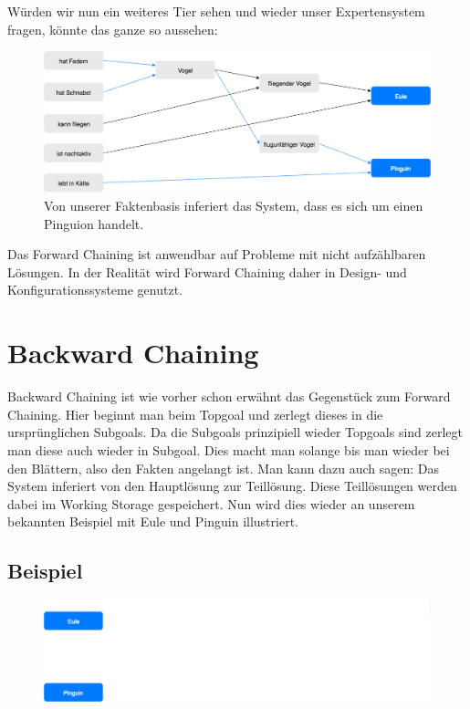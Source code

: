 \noindent Würden wir nun ein weiteres Tier sehen und wieder unser Expertensystem fragen, könnte das ganze so aussehen:
\begin{figure}[H]
    \centering
    \includegraphics[width=17cm]{chapters/expertensysteme/forward_chaining/forward_chaining_5}
    \caption{Von unserer Faktenbasis inferiert das System, dass es sich um einen Pinguion handelt.}
    \label{fig:forward_chaining_5}
\end{figure}

\noindent Das Forward Chaining ist anwendbar auf Probleme mit nicht aufzählbaren Lösungen. In der Realität wird Forward Chaining daher in Design- und Konfigurationssysteme genutzt.



\section{Backward Chaining}
Backward Chaining ist wie vorher schon erwähnt das Gegenstück zum Forward Chaining. Hier beginnt man beim Topgoal und zerlegt dieses in die ursprünglichen Subgoals. Da die Subgoals prinzipiell wieder Topgoals sind zerlegt man diese auch wieder in Subgoal. Dies macht man solange bis man wieder bei den Blättern, also den Fakten angelangt ist. Man kann dazu auch sagen: Das System inferiert von den Hauptlösung zur Teillösung. Diese Teillösungen werden dabei im Working Storage gespeichert. Nun wird dies wieder an unserem bekannten Beispiel mit Eule und Pinguin illustriert.

\subsection*{Beispiel}
\begin{figure}[H]
    \centering
    \includegraphics[width=17cm]{chapters/expertensysteme/backward_chaining/backward_chaining_1}
    \label{fig:backward_chaining_1}
\end{figure}

